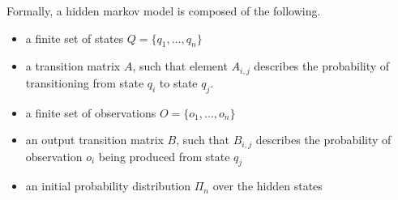 \begin{definition}
Formally, a hidden markov model is composed of the following.
\begin{itemize}
    \item a finite set of states $Q = \{q_1, ...,q_n\}$
    \item a transition matrix $A$, such that element $A_{i,j}$ describes the probability of transitioning from state $q_i$ to state $q_j$. 
    \item a finite set of observations $O = \{o_1,...,o_n\}$
    \item an output transition matrix $B$, such that $B_{i,j}$ describes the probability of observation $o_i$ being produced from state $q_j$
    \item an initial probability distribution $\Pi_n$ over the hidden states
\end{itemize}
\end{definition}

